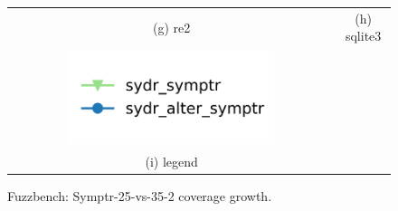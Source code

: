 \begin{figure}[t]
{\begin{tabular}{cc}
            (g) re2                                                                                                        & (h) sqlite3                                                                                                          \\[6pt]
            \includegraphics[width=0.65\textwidth]{assets/fuzzbench/symptr-25-vs-35-2/fuzzbench-legend.png}                &                                                                                                                      \\
            (i) legend                                                                                                     &                                                                                                                      \\[6pt]
        \end{tabular}
    }
    \caption{Fuzzbench: Symptr-25-vs-35-2 coverage growth.}
    \label{fig:fuzzbench:symptr-25-vs-35-2}
\end{figure}

